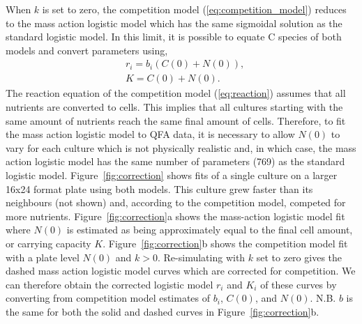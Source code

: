 When \(k\) is set to zero, the competition model
(\ref{eq:competition_model}) reduces to the mass action logistic model
which has the same sigmoidal solution as the standard logistic
model. In this limit, it is possible to equate C species of both
models and convert parameters using,
\begin{subequations}
  \label{eq:conversion}
  \begin{align}
    &r_{i} = b_{i}(C(0) + N(0)),\\
    &K = C(0) + N(0).
  \end{align}
\end{subequations}
%
The reaction equation of the competition model (\ref{eq:reaction})
assumes that all nutrients are converted to cells. This implies that
all cultures starting with the same amount of nutrients reach the same
final amount of cells. Therefore, to fit the mass action logistic
model to QFA data, it is necessary to allow \(N(0)\) to vary for each
culture which is not physically realistic and, in which case, the mass
action logistic model has the same number of parameters (769) as the
standard logistic model.
%
Figure~\ref{fig:correction} shows fits of a single culture on a larger
16x24 format plate using both models. This culture grew faster than
its neighbours (not shown) and, according to the competition model,
competed for more nutrients.
%
Figure~\ref{fig:correction}a shows the mass-action logistic model fit
where \(N(0)\) is estimated as being approximately equal to the
final cell amount, or carrying capacity \(K\).
%
Figure~\ref{fig:correction}b shows the competition model fit with a
plate level \(N(0)\) and \(k > 0\). Re-simulating with \(k\)
set to zero gives the dashed mass action logistic model curves which
are corrected for competition. We can therefore obtain the corrected
logistic model \(r_{i}\) and \(K_{i}\) of these curves by converting
from competition model estimates of \(b_{i}\), \(C(0)\), and
\(N(0)\). N.B. \(b\) is the same for both the solid and dashed
curves in Figure~\ref{fig:correction}b.

%

